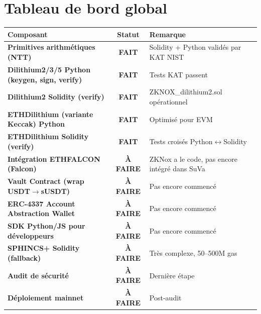\documentclass[12pt, a4paper]{article}
\newcommand{\statdone}{\textcolor{done_green}{\bfseries FAIT}}
\newcommand{\stattodo}{\textcolor{todo_red}{\bfseries À FAIRE}}
\begin{document}
\newpage
\section{Tableau de bord global}

\begin{center}
\renewcommand{\arraystretch}{1.4}
\begin{tabular}{|>{\bfseries}p{5.5cm}|c|p{6cm}|}
\hline
\rowcolor{suva_blue!20}
\textbf{Composant} & \textbf{Statut} & \textbf{Remarque} \\
\hline
Primitives arithmétiques (NTT) & \statdone & Solidity + Python validés par KAT NIST \\
\hline
Dilithium2/3/5 Python (keygen, sign, verify) & \statdone & Tests KAT passent \\
\hline
Dilithium2 Solidity (verify) & \statdone & ZKNOX\_dilithium2.sol opérationnel \\
\hline
ETHDilithium (variante Keccak) Python & \statdone & Optimisé pour EVM \\
\hline
ETHDilithium Solidity (verify) & \statdone & Tests croisés Python$\leftrightarrow$Solidity \\
\hline
\rowcolor{inprog_bg}
Intégration ETHFALCON (Falcon) & \stattodo & ZKNox a le code, pas encore intégré dans SuVa \\
\hline
\rowcolor{todo_bg}
Vault Contract (wrap USDT$\to$sUSDT) & \stattodo & Pas encore commencé \\
\hline
\rowcolor{todo_bg}
ERC-4337 Account Abstraction Wallet & \stattodo & Pas encore commencé \\
\hline
\rowcolor{todo_bg}
SDK Python/JS pour développeurs & \stattodo & Pas encore commencé \\
\hline
\rowcolor{todo_bg}
SPHINCS+ Solidity (fallback) & \stattodo & Très complexe, 50--500M gas \\
\hline
\rowcolor{todo_bg}
Audit de sécurité & \stattodo & Dernière étape \\
\hline
\rowcolor{todo_bg}
Déploiement mainnet & \stattodo & Post-audit \\
\hline
\end{tabular}
\end{center}

\vspace{0.5cm}
\begin{center}
\end{center}
\end{document}
